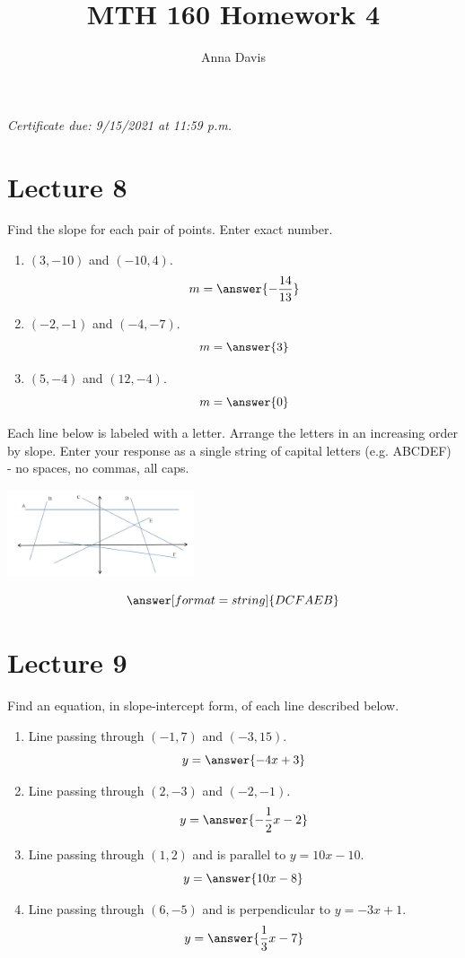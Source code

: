 \documentclass{ximera}
\author{Anna Davis} \title{MTH 160 Homework 4}
\begin{document}
\begin{abstract}

\end{abstract}
\maketitle
 \textit{Certificate due: 9/15/2021 at 11:59 p.m.}
 \section{Lecture 8}
\begin{problem}\label{prob:160hom4prob1} 
 Find the slope for each pair of points.  Enter exact number.
 \begin{enumerate}
     \item $(3, -10)$ and $(-10,4)$.
     $$m=\answer{-\frac{14}{13}}$$
     \item $(-2, -1)$ and $(-4,-7)$.
     $$m=\answer{3}$$
     \item $(5, -4)$ and $(12,-4)$.
     $$m=\answer{0}$$
 \end{enumerate}
 \end{problem}
 
 \begin{problem}\label{prob:160hom4prob2} 
 Each line below is labeled with a letter.  Arrange the letters in an increasing order by slope.  Enter your response as a single string of capital letters (e.g. ABCDEF) - no spaces, no commas, all caps.
 
 \begin{image}
   \includegraphics[height=1in]{160H4pic1.jpg}
 \end{image}
 $$\answer[format=string]{DCFAEB}$$
 \end{problem}
 \section{Lecture 9}
\begin{problem}\label{prob:160hom4prob3}
Find an equation, in slope-intercept form, of each line described below.
  \begin{enumerate}
      \item Line passing through $(-1, 7)$ and $(-3, 15)$.
      $$y=\answer{-4x+3}$$
      \item Line passing through $(2, -3)$ and $(-2, -1)$.
      $$y=\answer{-\frac{1}{2}x-2}$$
      \item Line passing through $(1,2)$ and is parallel to $y=10x-10$.
      $$y=\answer{10x-8}$$
      \item Line passing through $(6, -5)$ and is perpendicular to $y=-3x+1$.
      $$y=\answer{\frac{1}{3}x-7}$$
  \end{enumerate}
\end{problem}
\end{document}
